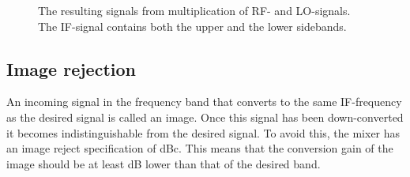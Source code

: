 			\begin{figure}[hpt!]
				\centering
				\caption{The resulting signals from multiplication of RF- and LO-signals. The IF-signal contains both the upper and the lower sidebands.}\label{fig:mixing_function}
			\end{figure}

		\subsection{Image rejection}
			An incoming signal in the frequency band that converts to the same IF-frequency as the desired signal is called an image. Once this signal has been down-converted it becomes indistinguishable from the desired signal. To avoid this, the mixer has an image reject specification of \unit[30]{dBc}. This means that the conversion gain of the image should be at least \unit[30]{dB} lower than that of the desired band.


